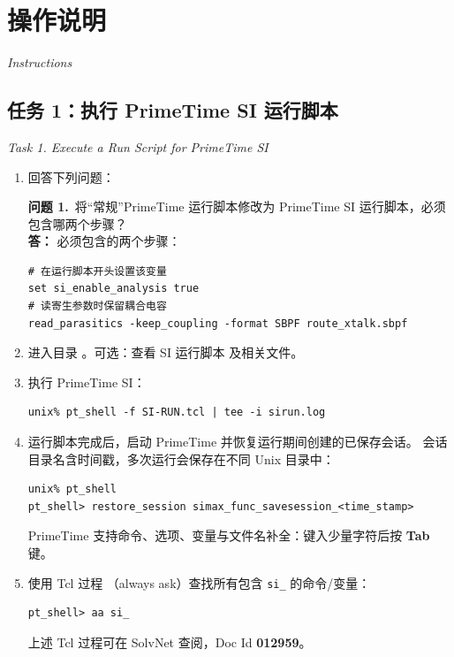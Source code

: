 \section{操作说明}
\label{lab8:instructions}

\noindent\textit{Instructions}

\subsection{任务 1：执行 PrimeTime SI 运行脚本}
\label{lab8:task1}

\noindent\textit{Task 1. Execute a Run Script for PrimeTime SI}

\begin{enumerate}
  \item 回答下列问题：
\begin{questionBox}
\textbf{问题 1.}\ 将“常规”PrimeTime 运行脚本修改为 PrimeTime SI 运行脚本，必须包含哪两个步骤？\\[0.35em]
\textbf{答：} 必须包含的两个步骤：
\begin{lstlisting}
# 在运行脚本开头设置该变量
set si_enable_analysis true
# 读寄生参数时保留耦合电容
read_parasitics -keep_coupling -format SBPF route_xtalk.sbpf
\end{lstlisting}
\end{questionBox}

  \item 进入目录 。可选：查看 SI 运行脚本  及相关文件。

  \item 执行 PrimeTime SI：
\begin{lstlisting}
unix% pt_shell -f SI-RUN.tcl | tee -i sirun.log
\end{lstlisting}

  \item 运行脚本完成后，启动 PrimeTime 并恢复运行期间创建的已保存会话。
        会话目录名含时间戳，多次运行会保存在不同 Unix 目录中：
\begin{lstlisting}
unix% pt_shell
pt_shell> restore_session simax_func_savesession_<time_stamp>
\end{lstlisting}

\begin{noteBox}
PrimeTime 支持命令、选项、变量与文件名补全：键入少量字符后按 \textbf{Tab} 键。
\end{noteBox}

  \item 使用 Tcl 过程 （always ask）查找所有包含 \texttt{si\_} 的命令/变量：
\begin{lstlisting}
pt_shell> aa si_
\end{lstlisting}

\begin{noteBox}
上述 Tcl 过程可在 SolvNet 查阅，Doc Id \textbf{012959}。
\end{noteBox}
\end{enumerate}

